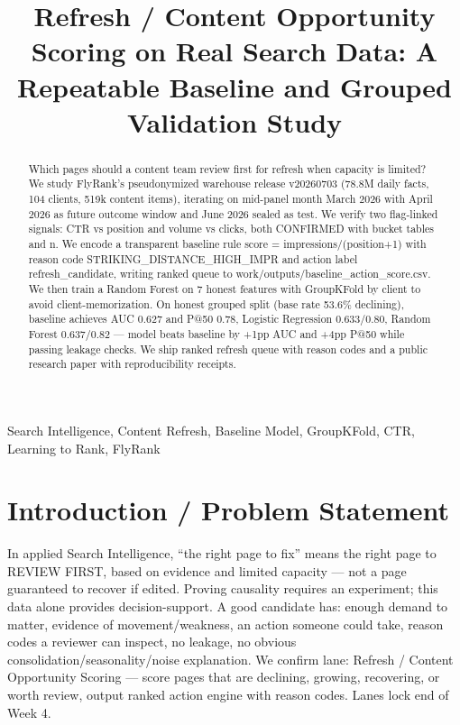 \documentclass[conference]{IEEEtran}
\begin{document}
\title{Refresh / Content Opportunity Scoring on Real Search Data: A Repeatable Baseline and Grouped Validation Study}

\author{
}

\maketitle

\begin{abstract}
Which pages should a content team review first for refresh when capacity is limited? We study FlyRank's pseudonymized warehouse release v20260703 (78.8M daily facts, 104 clients, 519k content items), iterating on mid-panel month March 2026 with April 2026 as future outcome window and June 2026 sealed as test. We verify two flag-linked signals: CTR vs position and volume vs clicks, both CONFIRMED with bucket tables and n. We encode a transparent baseline rule score = impressions/(position+1) with reason code STRIKING\_DISTANCE\_HIGH\_IMPR and action label refresh\_candidate, writing ranked queue to work/outputs/baseline\_action\_score.csv. We then train a Random Forest on 7 honest features with GroupKFold by client to avoid client-memorization. On honest grouped split (base rate 53.6\% declining), baseline achieves AUC 0.627 and P@50 0.78, Logistic Regression 0.633/0.80, Random Forest 0.637/0.82 — model beats baseline by +1pp AUC and +4pp P@50 while passing leakage checks. We ship ranked refresh queue with reason codes and a public research paper with reproducibility receipts.
\end{abstract}

\begin{IEEEkeywords}
Search Intelligence, Content Refresh, Baseline Model, GroupKFold, CTR, Learning to Rank, FlyRank
\end{IEEEkeywords}

\section{Introduction / Problem Statement}
In applied Search Intelligence, “the right page to fix” means the right page to REVIEW FIRST, based on evidence and limited capacity — not a page guaranteed to recover if edited. Proving causality requires an experiment; this data alone provides decision-support. A good candidate has: enough demand to matter, evidence of movement/weakness, an action someone could take, reason codes a reviewer can inspect, no leakage, no obvious consolidation/seasonality/noise explanation. We confirm lane: Refresh / Content Opportunity Scoring — score pages that are declining, growing, recovering, or worth review, output ranked action engine with reason codes. Lanes lock end of Week 4.
\end{document}
